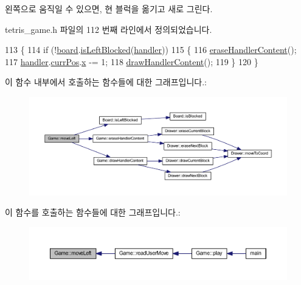 왼쪽으로 움직일 수 있으면, 현 블럭을 옮기고 새로 그린다. 



tetris\+\_\+game.\+h 파일의 112 번째 라인에서 정의되었습니다.


\begin{DoxyCode}
113     \{
114         \textcolor{keywordflow}{if} (!\mbox{\hyperlink{class_game_af5bc546b0c766ecf2f7e008f750832ed}{board}}.\mbox{\hyperlink{class_board_a5545704e21b5f7447eb9ffe014954cb3}{isLeftBlocked}}(\mbox{\hyperlink{class_game_ae72b7259125e83dfd258c6a132394eec}{handler}}))
115         \{
116             \mbox{\hyperlink{class_game_a7ab3d17dc7bf72f0a59fbb7b17c6ce5a}{eraseHandlerContent}}();
117             \mbox{\hyperlink{class_game_ae72b7259125e83dfd258c6a132394eec}{handler}}.\mbox{\hyperlink{class_block_handler_a11bd634fdc179446f9c6751e2394999e}{currPos}}.\mbox{\hyperlink{struct_coord_a696eaa744360fc791d0e3b331c549dbe}{x}} -= 1;
118             \mbox{\hyperlink{class_game_aa61075838d60bc5c850b72bc4804b7b8}{drawHandlerContent}}();
119         \}
120     \}
\end{DoxyCode}
이 함수 내부에서 호출하는 함수들에 대한 그래프입니다.\+:
\nopagebreak
\begin{figure}[H]
\begin{center}
\leavevmode
\includegraphics[width=350pt]{class_game_a3bd586b9c1bcd71f78bc2c2f7e2fe9e7_cgraph}
\end{center}
\end{figure}
이 함수를 호출하는 함수들에 대한 그래프입니다.\+:
\nopagebreak
\begin{figure}[H]
\begin{center}
\leavevmode
\includegraphics[width=350pt]{class_game_a3bd586b9c1bcd71f78bc2c2f7e2fe9e7_icgraph}
\end{center}
\end{figure}
\mbox{\label{class_game_a36ee055aa2c311deea72c38f50814007}} 
